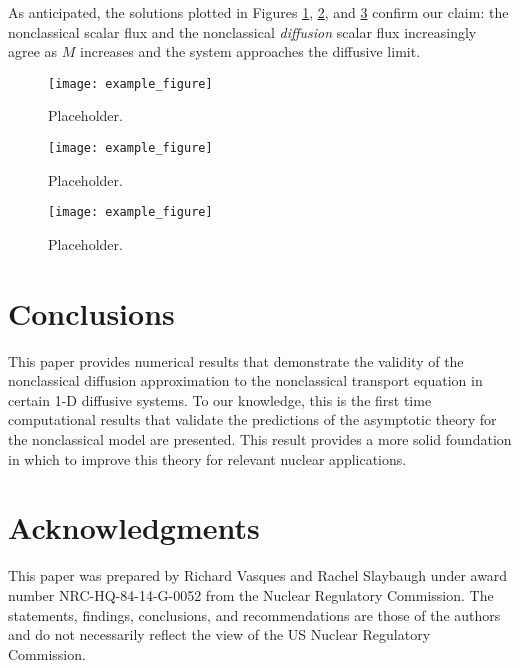 \documentclass{anstrans}
\begin{document}
As anticipated, the solutions plotted in Figures \ref{fig1}, \ref{fig2}, and \ref{fig3} confirm our claim: the nonclassical scalar flux and the nonclassical \textit{diffusion} scalar flux increasingly agree as $M$ increases and the system approaches the diffusive limit.

\begin{figure}[ht] %
  \centering
  \texttt{[image: example\_figure]}
  \caption{Placeholder.}
  \label{fig1}
\end{figure}
\begin{figure}[ht] %
  \centering
  \texttt{[image: example\_figure]}
  \caption{Placeholder.}
  \label{fig2}
\end{figure}
\begin{figure}[ht] %
  \centering
  \texttt{[image: example\_figure]}
  \caption{Placeholder.}
  \label{fig3}
\end{figure}

\section{Conclusions}
This paper provides numerical results that demonstrate the validity of the nonclassical diffusion approximation to the nonclassical transport equation in certain 1-D diffusive systems. To our knowledge, this is the first time computational results that validate the predictions of the asymptotic theory for the nonclassical model are presented. This result provides a more solid foundation 
in which to improve this theory for relevant nuclear applications.

\section{Acknowledgments}
This paper was prepared by Richard Vasques and Rachel Slaybaugh under award number NRC-HQ-84-14-G-0052 from the Nuclear Regulatory Commission. The statements, findings, conclusions, and recommendations are those of the authors and do not necessarily reflect the view of the US Nuclear Regulatory Commission.



\end{document}
